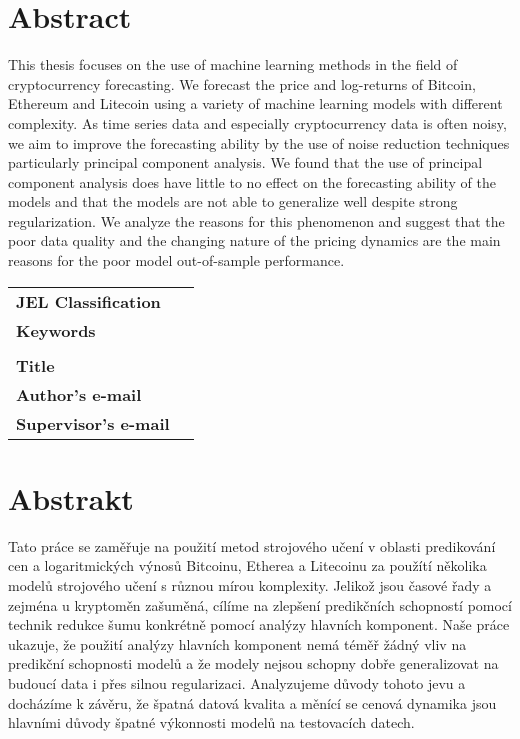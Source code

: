 \section*{Abstract}

This thesis focuses on the use of machine learning
methods in the field of cryptocurrency forecasting. 
We forecast the price and log-returns of Bitcoin, Ethereum and Litecoin
using a variety of machine learning models with different complexity.
As time series
data and especially cryptocurrency data is often noisy, we aim to improve the	
forecasting ability by the use of noise reduction techniques particularly 
principal component analysis.
We found that the use of principal component analysis
does have little to no effect on the forecasting ability of the models
and that the models are not able to generalize well despite 
strong regularization. 
We analyze the reasons for this phenomenon and suggest that the
poor data quality and the changing nature of the pricing dynamics
are the main reasons for the poor model out-of-sample performance.


\bigskip

\begin{tabular}{lp{8.6cm}}
		\textbf{JEL Classification} & \JEL \\
		\textbf{Keywords} & \Keywords \\
 		& \\
		\textbf{Title} & \Bookname \\
 		\textbf{Author's e-mail} & \texttt{\href{mailto:\Email}{\Email}}\\
		\textbf{Supervisor's e-mail} & \texttt{\href{mailto:\EmailSup}{\EmailSup}}\\
\end{tabular}

\bigskip

\section*{Abstrakt}\label{abstract}
Tato práce se zaměřuje na použití metod strojového učení v oblasti
predikování cen a logaritmických výnosů Bitcoinu, Etherea a Litecoinu
za použítí několika modelů strojového učení s různou mírou komplexity.
Jelikož jsou časové řady a zejména u kryptoměn zašuměná, cílíme
na zlepšení predikčních schopností pomocí technik redukce šumu 
konkrétně pomocí analýzy hlavních komponent.
Naše práce ukazuje, že použití analýzy hlavních komponent
nemá téměř žádný vliv na predikční schopnosti modelů
a že modely nejsou schopny dobře generalizovat na budoucí data
i přes silnou regularizaci. Analyzujeme
důvody tohoto jevu a docházíme k závěru, že
špatná datová kvalita a měnící se cenová dynamika 
jsou hlavními důvody špatné výkonnosti modelů na testovacích datech.

